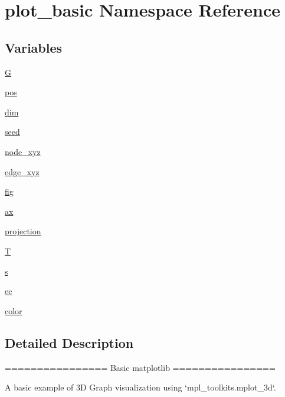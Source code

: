 \hypertarget{namespaceplot__basic}{}\section{plot\+\_\+basic Namespace Reference}
\label{namespaceplot__basic}
\subsection*{Variables}
\begin{DoxyCompactItemize}
\item 
\hyperlink{namespaceplot__basic_a475ee21ced11091a036fb46210ccf220}{G}
\item 
\hyperlink{namespaceplot__basic_a5a5fb434017be2c52593c4badc450797}{pos}
\item 
\hyperlink{namespaceplot__basic_acbffa26486d2cbee6b40dc92df7b9931}{dim}
\item 
\hyperlink{namespaceplot__basic_a6623e1bbb730440d597155f1a4757b5b}{seed}
\item 
\hyperlink{namespaceplot__basic_af4940b7ed2f79c2337e6663fe4d88639}{node\+\_\+xyz}
\item 
\hyperlink{namespaceplot__basic_a3f13254cce3b146f5baaffac52a0cb8b}{edge\+\_\+xyz}
\item 
\hyperlink{namespaceplot__basic_a3848b9989a72da3ed59d2fbeefc04d87}{fig}
\item 
\hyperlink{namespaceplot__basic_a706d074e2d69d44ba7f33e8932d965de}{ax}
\item 
\hyperlink{namespaceplot__basic_a26847adb135d2fe3a62b5acfe7e357f2}{projection}
\item 
\hyperlink{namespaceplot__basic_a0d74ec78dd4f6f70727fd332a5194f08}{T}
\item 
\hyperlink{namespaceplot__basic_a94812b39568f30eab2d24455b47673de}{s}
\item 
\hyperlink{namespaceplot__basic_a54156ed83ce1782cec3b0f9dd44e33c7}{ec}
\item 
\hyperlink{namespaceplot__basic_a937ba261483def3b80e295632c94e915}{color}
\end{DoxyCompactItemize}


\subsection{Detailed Description}
\begin{DoxyVerb}================
Basic matplotlib
================

A basic example of 3D Graph visualization using `mpl_toolkits.mplot_3d`.\end{DoxyVerb}
 

